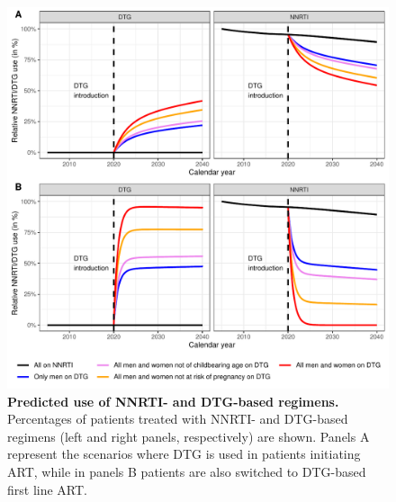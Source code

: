 \documentclass[10pt,letterpaper]{article}
\begin{document}
\begin{figure}[h!]
   \includegraphics[width=14cm]{../figures/Fig2.pdf}
   \vspace{0.5cm}
   \caption{{\bf Predicted use of NNRTI- and DTG-based regimens.}
Percentages of patients treated with NNRTI- and DTG-based regimens (left and right panels, respectively) are shown. Panels A represent the scenarios where DTG is used in patients initiating ART, while in panels B patients are also switched to DTG-based first line ART.}\label{fig2}
\end{figure}
\end{document}

